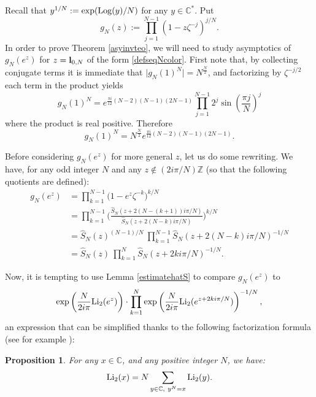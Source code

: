 \documentclass[11pt]{amsart}
\newtheorem{prop}[teo]{Proposition}
\newcommand{\mc}{\mathbb{C}}
\newcommand{\C}{\mathbb{C}}
\newcommand{\Z}{\mathbb{Z}}
\newcommand{\bl}{{\bf l}}
\newcommand{\Log}{{\rm Log}}
\begin{document}
{\color{black}

Recall that $y^{1/N}:=\exp(\Log(y)/N)$ for any $y\in \mc^*$. Put 
\begin{equation}\label{gfunctiondef}
g_N(z):=\prod_{j=1}^{N-1} (1-z\zeta^{-j})^{j/N}.
\end{equation}
In order to prove Theorem \ref{asyinvteo}, we will need to study asymptotics of $g_N(e^z)$ for $z=\bl_{0,N}$ of the form \eqref{defseqNcolor}. First note that, by collecting conjugate terms it is immediate that $\vert g_N(1)^N\vert =N^{\frac{N}{2}}$, and factorizing by $\zeta^{-j/2}$ each term in the product yields
$$ g_N(1)^N = e^{\frac{\pi i}{12}(N-2)(N-1)(2N-1)} \prod_{j=1}^{N-1}2^j\sin\left(\frac{\pi j}{N}\right)^j$$
where the product is real positive. Therefore 
\begin{equation}\label{cstBBP}
g_N(1)^N  = N^{\frac{N}{2}}e^{\frac{\pi i}{12}(N-2)(N-1)(2N-1)}.
\end{equation}

Before considering $g_N(e^z)$ for more general $z$, let us do some rewriting. We have, for any odd integer $N$ and any $z \notin (2 i \pi/N) \Z$ (so that the following quotients are defined):
\begin{align}  g_N(e^z) & = \prod_{k=1}^{N-1} \bigl(1-e^z\zeta^{-k}\bigr)^{k/N}\nonumber  \\ & =  \prod_{k=1}^{N-1} \biggl(\frac{\hat S_N(z + 2(N-(k+1))i\pi/N)}{\hat S_N(z+ 2(N-k)i\pi/N)}\biggr)^{k/N}\nonumber\\  & =   \hat S_N(z)^{(N-1)/N}\ \prod_{k=1}^{N-1} \hat S_N\left(z+2(N-k)i\pi/N\right)^{-1/N} \nonumber \\ & =  \hat S_N(z) \ \prod_{k=1}^{N} \hat S_N\left(z+2ki\pi/N\right)^{-1/N}.\label{prodformgN} \end{align}

Now, it is tempting to use Lemma \ref{estimatehatS} to compare $g_N(e^z)$ to
\begin{equation}\label{ratiogNclass0mars25}
\exp\left( \frac{N}{2i\pi}{\rm Li_2}(e^z)\right) \cdot 
\prod_{k=1}^{N} \exp\left( \frac{N}{2i\pi}{\rm Li_2}(e^{z+2ki\pi/N})\right)^{-1/N}, 
\end{equation}
an expression that can be simplified thanks to the following factorization formula (see for example \cite[page 7]{Z}):

\begin{prop}
For any $x \in \C$, and any positive integer $N$, we have:
$${\rm Li_2}(x)=N \sum_{y \in \C, \ y^N=x} {\rm Li_2}(y).$$
\end{prop}

}
\end{document}
